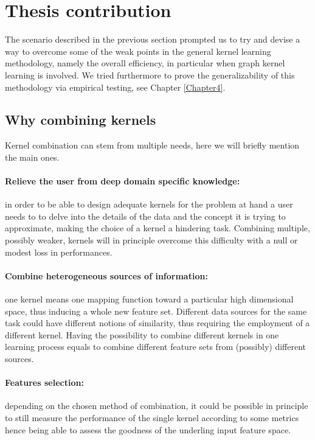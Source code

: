 
\section{Thesis contribution}

The scenario described in the previous section prompted us to try and devise a way to
overcome some of the weak points in the general kernel learning methodology, namely
the overall efficiency, in particular when graph kernel learning is involved.
We tried furthermore to prove the generalizability of this methodology via empirical
testing, see Chapter \ref{Chapter4}.

\subsection{Why combining kernels}
\label{sec:why}

Kernel combination can stem from multiple needs, here we will briefly mention the main ones.

\paragraph{Relieve the user from deep domain specific knowledge:} in order to be able to design
adequate kernels for the problem at hand a user needs to to delve into the details of the data
and the concept it is trying to approximate, making the choice of a kernel a hindering task.
Combining multiple, possibly weaker, kernels will in principle overcome this difficulty with
a null or modest loss in performances.
\paragraph{Combine heterogeneous sources of information:} one kernel means one mapping function
toward a particular high dimensional space, thus inducing a whole new feature set.
Different data sources for the same task could have different notions of similarity,
thus requiring the employment of a different kernel.
Having the possibility to combine different kernels in one learning process equals
to combine different feature sets from (possibly) different sources.
\paragraph{Features selection:} depending on the chosen method of combination, it could be
possible in principle to still measure the performance of the single kernel according
to some metrics hence being able to assess the goodness of the underling input feature space.
